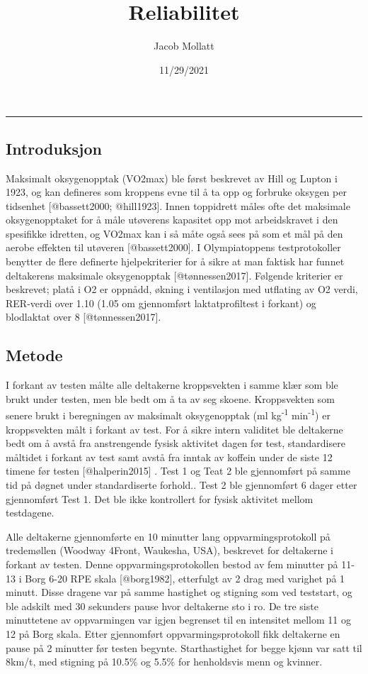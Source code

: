 \documentclass[
]{article}
\title{Reliabilitet}
\author{Jacob Mollatt}
\date{11/29/2021}
\begin{document}
\maketitle

\begin{center}\rule{0.5\linewidth}{0.5pt}\end{center}

\hypertarget{introduksjon}{%
\subsection{Introduksjon}\label{introduksjon}}

Maksimalt oksygenopptak (VO2max) ble først beskrevet av Hill og Lupton i
1923, og kan defineres som kroppens evne til å ta opp og forbruke
oksygen per tidsenhet {[}@bassett2000; @hill1923{]}. Innen toppidrett
måles ofte det maksimale oksygenopptaket for å måle utøverens kapasitet
opp mot arbeidskravet i den spesifikke idretten, og VO2max kan i så måte
også sees på som et mål på den aerobe effekten til utøveren
{[}@bassett2000{]}. I Olympiatoppens testprotokoller benytter de flere
definerte hjelpekriterier for å sikre at man faktisk har funnet
deltakerens maksimale oksygenopptak {[}@tønnessen2017{]}. Følgende
kriterier er beskrevet; platå i O2 er oppnådd, økning i ventilasjon med
utflating av O2 verdi, RER-verdi over 1.10 (1.05 om gjennomført
laktatprofiltest i forkant) og blodlaktat over 8 {[}@tønnessen2017{]}.

\hypertarget{metode}{%
\subsection{Metode}\label{metode}}

I forkant av testen målte alle deltakerne kroppsvekten i samme klær som
ble brukt under testen, men ble bedt om å ta av seg skoene. Kroppsvekten
som senere brukt i beregningen av maksimalt oksygenopptak (ml
kg\textsuperscript{-1} min\textsuperscript{-1}) er kroppsvekten målt i
forkant av test. For å sikre intern validitet ble deltakerne bedt om å
avstå fra anstrengende fysisk aktivitet dagen før test, standardisere
måltidet i forkant av test samt avstå fra inntak av koffein under de
siste 12 timene før testen {[}@halperin2015{]} . Test 1 og Teat 2 ble
gjennomført på samme tid på døgnet under standardiserte forhold.. Test 2
ble gjennomført 6 dager etter gjennomført Test 1. Det ble ikke
kontrollert for fysisk aktivitet mellom testdagene.

Alle deltakerne gjennomførte en 10 minutter lang oppvarmingsprotokoll på
tredemøllen (Woodway 4Front, Waukesha, USA), beskrevet for deltakerne i
forkant av testen. Denne oppvarmingsprotokollen bestod av fem minutter
på 11-13 i Borg 6-20 RPE skala {[}@borg1982{]}, etterfulgt av 2 drag med
varighet på 1 minutt. Disse dragene var på samme hastighet og stigning
som ved teststart, og ble adskilt med 30 sekunders pause hvor deltakerne
sto i ro. De tre siste minuttetene av oppvarmingen var igjen begrenset
til en intensitet mellom 11 og 12 på Borg skala. Etter gjennomført
oppvarmingsprotokoll fikk deltakerne en pause på 2 minutter før testen
begynte. Starthastighet for begge kjønn var satt til 8km/t, med stigning
på 10.5\% og 5.5\% for henholdsvis menn og kvinner.
\end{document}
